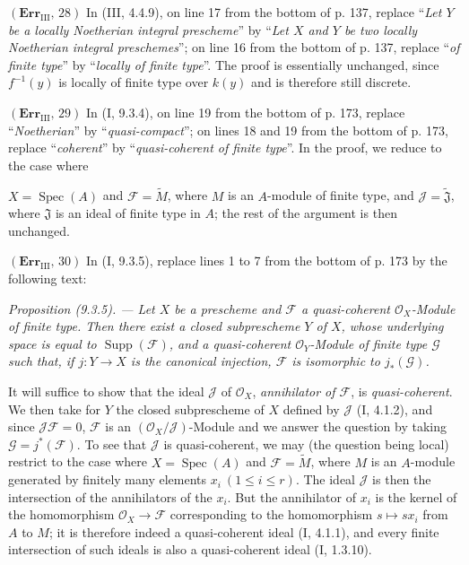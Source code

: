 \documentclass[10pt,oneside]{book}
\newcommand{\sh}[1]{\mathscr{#1}}
\newcommand{\Spec}{\operatorname{Spec}}
\newcommand{\oldpage}[2][]{\setcounter{footnote}{0}\marginpar{\scriptsize\textbf{#1}~|~#2}\ignorespaces}
\begin{document}
\noindent\textbf{$(\mathbf{Err}_{\mathrm{III}},\,28)$} In (III, 4.4.9), on
line 17 from the bottom of p. 137, replace ``\emph{Let $Y$ be a locally
Noetherian integral prescheme}'' by ``\emph{Let $X$ and $Y$ be two locally
Noetherian integral preschemes}''; on line 16 from the bottom of p. 137,
replace ``\emph{of finite type}'' by ``\emph{locally of finite type}''. The
proof is essentially unchanged, since $f^{-1}(y)$ is locally of finite type
over $k(y)$ and is therefore still discrete.

\noindent\textbf{$(\mathbf{Err}_{\mathrm{III}},\,29)$} In (I, 9.3.4), on line
19 from the bottom of p. 173, replace ``\emph{Noetherian}'' by
``\emph{quasi-compact}''; on lines 18 and 19 from the bottom of p. 173,
replace ``\emph{coherent}'' by ``\emph{quasi-coherent of finite type}''. In
the proof, we reduce to the case where

\oldpage[III]{223}
$X=\Spec(A)$ and $\sh{F}=\widetilde M$, where $M$ is an $A$-module of finite
type, and $\sh{J}=\widetilde{\mathfrak J}$, where $\mathfrak J$ is an ideal of
finite type in $A$; the rest of the argument is then unchanged.

\noindent\textbf{$(\mathbf{Err}_{\mathrm{III}},\,30)$} In (I, 9.3.5),
replace lines 1 to 7 from the bottom of p. 173 by the following text:

\emph{Proposition (9.3.5). --- Let $X$ be a prescheme and $\sh{F}$ a
quasi-coherent $\sh{O}_X$-Module of finite type. Then there exist a closed
subprescheme $Y$ of $X$, whose underlying space is equal to
$\operatorname{Supp}(\sh{F})$, and a quasi-coherent $\sh{O}_Y$-Module of
finite type $\sh{G}$ such that, if $j:Y\to X$ is the canonical injection,
$\sh{F}$ is isomorphic to $j_*(\sh{G})$.}

It will suffice to show that the ideal $\sh{J}$ of $\sh{O}_X$,
\emph{annihilator of $\sh{F}$}, is \emph{quasi-coherent}. We then take for $Y$
the closed subprescheme of $X$ defined by $\sh{J}$ (I, 4.1.2), and since
$\sh{J}\sh{F}=0$, $\sh{F}$ is an $(\sh{O}_X/\sh{J})$-Module and we answer the
question by taking $\sh{G}=j^*(\sh{F})$. To see that $\sh{J}$ is
quasi-coherent, we may (the question being local) restrict to the case where
$X=\Spec(A)$ and $\sh{F}=\widetilde M$, where $M$ is an $A$-module generated
by finitely many elements $x_i\ (1\leq i\leq r)$. The ideal $\sh{J}$ is then
the intersection of the annihilators of the $x_i$. But the annihilator of
$x_i$ is the kernel of the homomorphism $\sh{O}_X\to\sh{F}$ corresponding to
the homomorphism $s\mapsto sx_i$ from $A$ to $M$; it is therefore indeed a
quasi-coherent ideal (I, 4.1.1), and every finite intersection of such ideals
is also a quasi-coherent ideal (I, 1.3.10).
\end{document}
